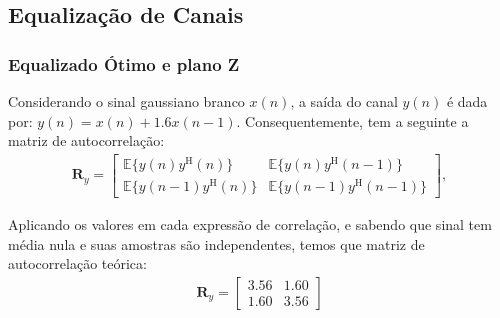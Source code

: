 \subsection{Equalização de Canais} %

\subsubsection*{Equalizado Ótimo e plano Z}

Considerando o sinal gaussiano branco $x(n)$, a saída do canal $y(n)$ é dada por: $ y(n) = x(n) + 1.6 x(n - 1)$. Consequentemente, tem a seguinte a matriz de autocorrelação:
\begin{align*}
    \mathbf{R}_{y} =
    \begin{bmatrix}
        \mathbb{E}\{y(n)y^{\text{H}}(n)\} & \mathbb{E}\{y(n)y^{\text{H}}(n - 1)\} \\
        \mathbb{E}\{y(n - 1)y^{\text{H}}(n)\} & \mathbb{E}\{y(n - 1)y^{\text{H}}(n - 1)\}
    \end{bmatrix},
\end{align*}

Aplicando os valores em cada expressão de correlação, e sabendo que sinal tem média nula e suas amostras são independentes, temos que matriz de autocorrelação teórica:
\begin{align*}
    \mathbf{R}_{y} =
    \begin{bmatrix}
        3.56 & 1.60 \\
        1.60 & 3.56
    \end{bmatrix}
\end{align*}

